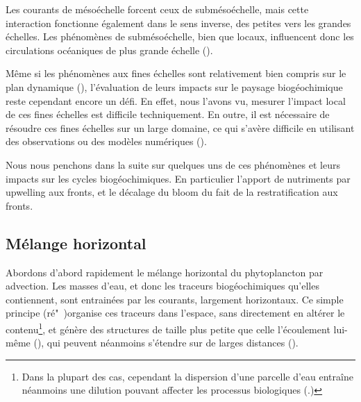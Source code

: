 Les courants de mésoéchelle forcent ceux de submésoéchelle, mais cette interaction fonctionne également dans le sens inverse, des petites vers les grandes échelles.
Les phénomènes de submésoéchelle, bien que locaux, influencent donc les circulations océaniques de plus grande échelle (\cite{sasaki_2020,balwada_2022,naveiragarabato_2022,taylor_2023}).


Même si les phénomènes aux fines échelles sont relativement bien compris sur le plan dynamique (\cite{mcwilliams_2016,mcwilliams_2019,gula_2022,taylor_2023}), l'évaluation de leurs impacts sur le paysage biogéochimique reste cependant encore un défi.
En effet, nous l'avons vu, mesurer l'impact local de ces fines échelles est difficile techniquement.
En outre, il est nécessaire  de résoudre ces fines échelles sur un large domaine, ce qui s'avère difficile en utilisant des observations ou des modèles numériques (\cite{fox-kemper_2019,levy_2023}).

Nous nous penchons dans la suite sur quelques uns de ces phénomènes et leurs impacts sur les cycles biogéochimiques.
En particulier l'apport de nutriments par upwelling aux fronts, et le décalage du bloom du fait de la restratification aux fronts.

\subsection{Mélange horizontal}

Abordons d'abord rapidement le mélange horizontal du phytoplancton par advection.
Les masses  d'eau, et donc les traceurs biogéochimiques qu'elles contiennent, sont entrainées par les courants, largement horizontaux.
Ce simple principe (ré"~)organise ces traceurs dans l'espace, sans directement en altérer le contenu\footnote{%
  Dans la plupart des cas, cependant la dispersion d'une parcelle d'eau entraîne néanmoins une dilution pouvant affecter les processus biologiques (\cite{lehahn_2017}.)
}, et génère des structures de taille plus petite que celle l'écoulement lui-même  (\cite{abraham_1998,lehahn_2007,dovidio_2010,levy_2018,lehahn_2018}), qui peuvent néanmoins s'étendre sur de larges distances (\cite{sergi_2020}).


